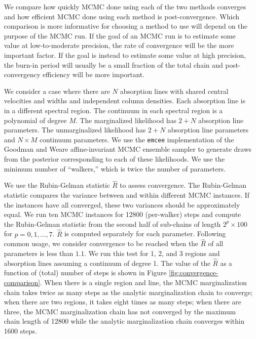 \documentclass[trackchanges]{aastex62}
\begin{document}
{We compare how quickly MCMC done using each of the two methods converges and how efficient MCMC done using each method is post-convergence.
Which comparison is more informative for choosing a method to use will depend on the purpose of the MCMC run.
If the goal of an MCMC run is to estimate some value at low-to-moderate precision, the rate of convergence will be the more important factor.
If the goal is instead to estimate some value at high precision, the burn-in period will usually be a small fraction of the total chain and post-convergency efficiency will be more important.

We consider a case where there are $N$ absorption lines with shared central velocities and widths and independent column densities.
Each absorption line is in a different spectral region.
The continuum in each spectral region is a polynomial of degree $M$.
The marginalized likelihood has $2 + N$ absorption line parameters.
The unmarginalized likelihood has $2 + N$ absorption line parameters and $N \times M$ continuum parameters.
We use the \texttt{emcee} implementation of the Goodman and Weare affine-invariant MCMC ensemble sampler to generate draws from the posterior corresponding to each of these likelihoods.
We use the minimum number of ``walkers,'' which is twice the number of parameters.

We use the Rubin-Gelman statistic $\hat{R}$ \citep{Gelman:1992zz} to assess convergence.
The Rubin-Gelman statistic compares the variance between and within different MCMC instances.
If the instances have all converged, these two variances should be approximately equal.
We run ten MCMC instances for 12800 (per-walker) steps and compute the Rubin-Gelman statistic from the second half of sub-chains of length $2^p \times 100$ for $p=0, 1, \ldots, 7$.
$\hat{R}$ is computed separately for each parameter.
Following common usage, we consider convergence to be reached when the $\hat{R}$ of all parameters is less than $1.1$.
We run this test for 1, 2, and 3 regions and absorption lines assuming a continuum of degree 1.
The value of the $\hat{R}$ as a function of (total) number of steps is shown in Figure \ref{fig:convergence-comparison}.
When there is a single region and line, the MCMC marginalization chain takes twice as many steps as the analytic marginalization chain to converge; when there are two regions, it takes eight times as many steps; when there are three, the MCMC marginalization chain has not converged by the maximum chain length of 12800 while the analytic marginalization chain converges within 1600 steps.

}
\end{document}
